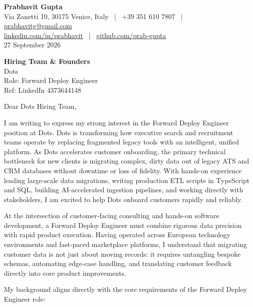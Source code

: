 \documentclass[10.5pt,a4paper]{article}
\begin{document}
\textbf{\large Prabhavit Gupta}\\
Via Zanetti 10, 30175 Venice, Italy ~$\vert$~ +39 351 610 7807 ~$\vert$~ \href{mailto:prabhavitg@gmail.com}{prabhavitg@gmail.com}\\
\href{https://www.linkedin.com/in/prabhavit/}{linkedin.com/in/prabhavit} ~$\vert$~ \href{https://github.com/prab-gupta}{github.com/prab-gupta}\\
27 September 2026

\textbf{Hiring Team \& Founders}\\
Dots\\
Role: Forward Deploy Engineer\\
Ref: LinkedIn 4373644148

Dear Dots Hiring Team,

I am writing to express my strong interest in the Forward Deploy Engineer position at Dots. Dots is transforming how executive search and recruitment teams operate by replacing fragmented legacy tools with an intelligent, unified platform. As Dots accelerates customer onboarding, the primary technical bottleneck for new clients is migrating complex, dirty data out of legacy ATS and CRM databases without downtime or loss of fidelity. With hands-on experience leading large-scale data migrations, writing production ETL scripts in TypeScript and SQL, building AI-accelerated ingestion pipelines, and working directly with stakeholders, I am excited to help Dots onboard customers rapidly and reliably.

At the intersection of customer-facing consulting and hands-on software development, a Forward Deploy Engineer must combine rigorous data precision with rapid product execution. Having operated across European technology environments and fast-paced marketplace platforms, I understand that migrating customer data is not just about moving records: it requires untangling bespoke schemas, automating edge-case handling, and translating customer feedback directly into core product improvements.

My background aligns directly with the core requirements of the Forward Deploy Engineer role:
\end{document}
